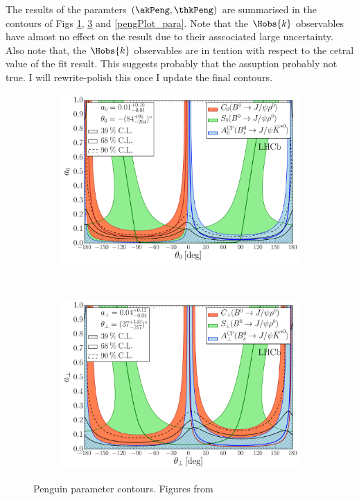 The results of the paramters $(\akPeng,\thkPeng)$ are summarised in the contours of
Figs \ref{pengPlot_long}, \ref{pengPlot_perp} and \ref{pengPlot_para}. Note that the $\Hobs{k}$ observables have almost no
effect on the result due to their asscociated large uncertainty. Also note that, the $\Hobs{k}$ observables are in
tention with respect to the cetral value of the fit result. This suggests probably that the assuption
 probably not true. {\color{red} I will rewrite-polish this once I update the final contours.}

\begin{figure}[h]
\begin{center}
  \begin{subfigure}{1\textwidth}
    \includegraphics[trim=0.0cm 0.0cm 0.0cm 0.0cm, clip=true,scale=0.4]{Figures/Chapter5/Penguin_Contribution_Ang_vs_Abs_allB2VV_Long.pdf}
    \caption{}
    \label{pengPlot_long}
  \end{subfigure}\\
  \begin{subfigure}{1\textwidth}
    \includegraphics[trim=0.0cm 0.0cm 0.0cm 0.0cm, clip=true,scale=0.4]{Figures/Chapter5/Penguin_Contribution_Ang_vs_Abs_allB2VV_Perp.pdf}
    \caption{}
    \label{pengPlot_perp}
  \end{subfigure}
  \caption{Penguin parameter contours. Figures from~\cite{DeBruyn-thesis}}
\end{center}
\end{figure}

